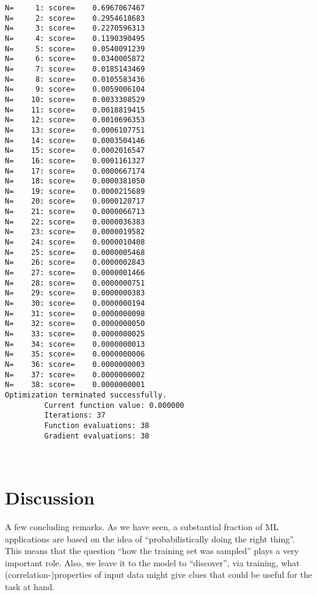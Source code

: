 \documentclass[11pt]{article}
\begin{document}
    \begin{Verbatim}[commandchars=\\\{\}]
N=     1: score=    0.6967067467
N=     2: score=    0.2954618683
N=     3: score=    0.2270596313
N=     4: score=    0.1190390495
N=     5: score=    0.0540091239
N=     6: score=    0.0340005872
N=     7: score=    0.0185143469
N=     8: score=    0.0105583436
N=     9: score=    0.0059006104
N=    10: score=    0.0033308529
N=    11: score=    0.0018819415
N=    12: score=    0.0010696353
N=    13: score=    0.0006107751
N=    14: score=    0.0003504146
N=    15: score=    0.0002016547
N=    16: score=    0.0001161327
N=    17: score=    0.0000667174
N=    18: score=    0.0000381050
N=    19: score=    0.0000215689
N=    20: score=    0.0000120717
N=    21: score=    0.0000066713
N=    22: score=    0.0000036383
N=    23: score=    0.0000019582
N=    24: score=    0.0000010408
N=    25: score=    0.0000005468
N=    26: score=    0.0000002843
N=    27: score=    0.0000001466
N=    28: score=    0.0000000751
N=    29: score=    0.0000000383
N=    30: score=    0.0000000194
N=    31: score=    0.0000000098
N=    32: score=    0.0000000050
N=    33: score=    0.0000000025
N=    34: score=    0.0000000013
N=    35: score=    0.0000000006
N=    36: score=    0.0000000003
N=    37: score=    0.0000000002
N=    38: score=    0.0000000001
Optimization terminated successfully.
         Current function value: 0.000000
         Iterations: 37
         Function evaluations: 38
         Gradient evaluations: 38
    \end{Verbatim}

    \begin{center}
    \end{center}
    { \hspace*{\fill} \\}
    
    \hypertarget{discussion}{%
\section{Discussion}\label{discussion}}

A few concluding remarks. As we have seen, a substantial fraction of ML
applications are based on the idea of ``probabilistically doing the
right thing''. This means that the question ``how the training set was
sampled'' plays a very important role. Also, we leave it to the model to
``discover'', via training, what (correlation-)properties of input data
might give clues that could be useful for the task at hand.
\end{document}
